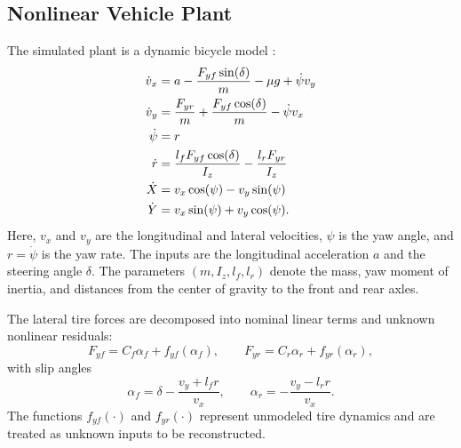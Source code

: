 \subsection{Nonlinear Vehicle Plant}
The simulated plant is a dynamic bicycle model \cite{LPV_vehicle}:
\begin{subequations}\label{LPV_simu}
\begin{align}
    \dot{v}_x &= a - \frac{F_{yf}\sin(\delta)}{m} - \mu g + \dot{\psi}v_y \\
    \dot{v}_y &= \frac{F_{yr}}{m} + \frac{F_{yf}\cos(\delta)}{m} - \dot{\psi}v_x \\
    \dot{\psi} &= r \\
    \dot{r} &= \frac{l_fF_{yf}\cos(\delta)}{I_z} - \frac{l_rF_{yr}}{I_z} \\
    \dot{X} &= v_x\cos(\psi) - v_y\sin(\psi) \\ \notag
    \dot{Y} &= v_x\sin(\psi) + v_y\cos(\psi).
\end{align}
\end{subequations}
Here, $v_x$ and $v_y$ are the longitudinal and lateral velocities, $\psi$ is the yaw angle, and $r=\dot{\psi}$ is the yaw rate. The inputs are the longitudinal acceleration $a$ and the steering angle $\delta$. The parameters $(m,I_z,l_f,l_r)$ denote the mass, yaw moment of inertia, and distances from the center of gravity to the front and rear axles.

The lateral tire forces are decomposed into nominal linear terms and unknown nonlinear residuals:
\begin{equation}
    F_{yf}=C_f\alpha_f+f_{yf}(\alpha_f), \qquad
    F_{yr}=C_r\alpha_r+f_{yr}(\alpha_r),
\end{equation}
with slip angles
\begin{equation}
    \alpha_f=\delta-\frac{v_y+l_f r}{v_x}, \qquad
    \alpha_r=-\frac{v_y-l_r r}{v_x}.
\end{equation}
The functions $f_{yf}(\cdot)$ and $f_{yr}(\cdot)$ represent unmodeled tire dynamics and are treated as unknown inputs to be reconstructed.

